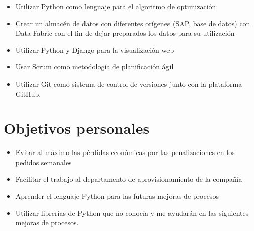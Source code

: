 \begin{itemize}

\item Utilizar Python como lenguaje para el algoritmo de optimización

\item Crear un almacén de datos con diferentes orígenes (SAP, base de datos) con Data Fabric con el fin de dejar preparados los datos para su utilización 

\item Utilizar Python y Django para la visualización web

\item Usar Scrum como metodología de planificación ágil

\item Utilizar Git como sistema de control de versiones junto con la plataforma GitHub.

\end{itemize}

\section{Objetivos personales}
\begin{itemize}
\item Evitar al máximo las pérdidas económicas por las penalizaciones en los pedidos semanales 
\item Facilitar el trabajo al departamento de aprovisionamiento de la compañía
\item Aprender el lenguaje Python para las futuras mejoras de procesos
\item Utilizar librerías de Python que no conocía y me ayudarán en las siguientes mejoras de procesos. 
\end{itemize}
